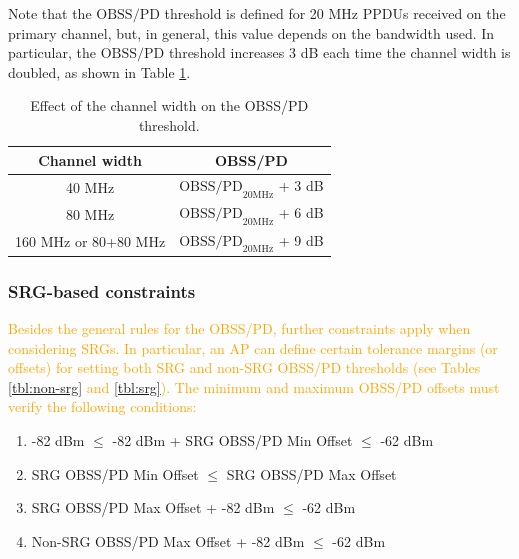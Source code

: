 \documentclass{ieeeaccess}
\begin{document}
Note that the $\text{OBSS/PD}$ threshold is defined for 20 MHz PPDUs received on the primary channel, but, in general, this value depends on the bandwidth used. In particular, the $\text{OBSS/PD}$ threshold increases 3 dB each time the channel width is doubled, as shown in Table \ref{tbl:sensitivity_channel_width}.
\begin{table}[ht!]
	\centering
	\begin{tabular}{|c|c|}
		\hline
		\textbf{Channel width} & \textbf{OBSS/PD} \\ \hline
		40 MHz & $\text{OBSS/PD}_{20 \text{MHz}}$ + 3 dB \\ \hline
		80 MHz & $\text{OBSS/PD}_{20 \text{MHz}}$ + 6 dB \\ \hline
		160 MHz or 80+80 MHz &  $\text{OBSS/PD}_{20 \text{MHz}}$ + 9 dB \\ \hline
	\end{tabular}
	\caption{Effect of the channel width on the OBSS/PD threshold.}
	\label{tbl:sensitivity_channel_width}
\end{table}

\subsubsection{SRG-based constraints}	
\textcolor{orange}{Besides the general rules for the OBSS/PD, further constraints apply when considering SRGs. In particular, an AP can define certain tolerance margins (or offsets) for setting both SRG and non-SRG OBSS/PD thresholds (see Tables \ref{tbl:non-srg} and \ref{tbl:srg}). The minimum and maximum OBSS/PD offsets must verify the following conditions:}
\begin{enumerate}
	\item -82 dBm $\leq$ -82 dBm + SRG OBSS/PD Min Offset $\leq$ -62 dBm 
	\item SRG OBSS/PD Min Offset $\leq$ SRG OBSS/PD Max Offset
	\item SRG OBSS/PD Max Offset + -82 dBm $\leq$ -62 dBm 
	\item Non-SRG OBSS/PD Max Offset + -82 dBm $\leq$  -62 dBm
\end{enumerate}
\end{document}
